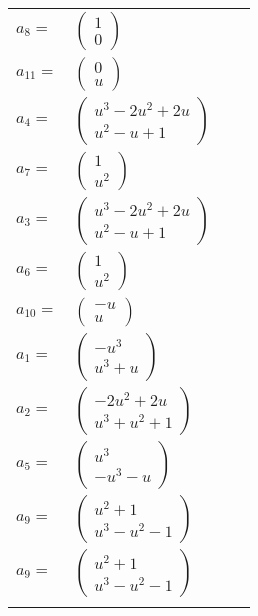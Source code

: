 \documentclass[1p]{elsarticle_modified}
\theoremstyle{definition}
\begin{document}
\begin{tabular}{m{7pt} m{180pt} m{7pt} m{180pt} }
\flushright $a_{8}=$&$\begin{pmatrix}1\\0\end{pmatrix}$ \\
\flushright $a_{11}=$&$\begin{pmatrix}0\\u\end{pmatrix}$ \\
\flushright $a_{4}=$&$\begin{pmatrix}u^3-2 u^2+2 u\\u^2- u+1\end{pmatrix}$ \\
\flushright $a_{7}=$&$\begin{pmatrix}1\\u^2\end{pmatrix}$ \\
\flushright $a_{3}=$&$\begin{pmatrix}u^3-2 u^2+2 u\\u^2- u+1\end{pmatrix}$ \\
\flushright $a_{6}=$&$\begin{pmatrix}1\\u^2\end{pmatrix}$ \\
\flushright $a_{10}=$&$\begin{pmatrix}- u\\u\end{pmatrix}$ \\
\flushright $a_{1}=$&$\begin{pmatrix}- u^3\\u^3+u\end{pmatrix}$ \\
\flushright $a_{2}=$&$\begin{pmatrix}-2 u^2+2 u\\u^3+u^2+1\end{pmatrix}$ \\
\flushright $a_{5}=$&$\begin{pmatrix}u^3\\- u^3- u\end{pmatrix}$ \\
\flushright $a_{9}=$&$\begin{pmatrix}u^2+1\\u^3- u^2-1\end{pmatrix}$\\ \flushright $a_{9}=$&$\begin{pmatrix}u^2+1\\u^3- u^2-1\end{pmatrix}$\\&\end{tabular}
\end{document}
